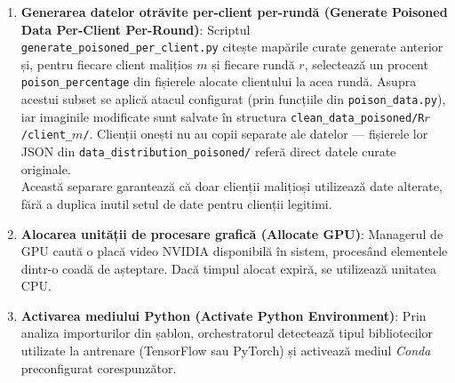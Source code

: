 \documentclass[../../main.tex]{subfiles}
\begin{document}
\begin{enumerate}
        \item \textbf{Generarea datelor otrăvite per-client per-rundă (Generate Poisoned Data Per-Client Per-Round)}: Scriptul \texttt{generate\_poisoned\_per\_client\-.py} citește mapările curate generate anterior și, pentru fiecare client malițios $m$ și fiecare rundă $r$, selectează un procent \texttt{poison\_percentage} din fișierele alocate clientului la acea rundă. Asupra acestui subset se aplică atacul configurat (prin funcțiile din \texttt{poison\_data.py}), iar imaginile modificate sunt salvate în structura \texttt{clean\_data\_poisoned/R$r$/client\_$m$/}. Clienții onești nu au copii separate ale datelor --- fișierele lor JSON din \texttt{data\_distribution\_poisoned/} referă direct datele curate originale. \\ Această separare garantează că doar clienții malițioși utilizează date alterate, fără a duplica inutil setul de date pentru clienții legitimi.
        \item \textbf{Alocarea unității de procesare grafică (Allocate GPU)}: Managerul de GPU caută o placă video NVIDIA disponibilă în sistem, procesând elementele dintr-o coadă de așteptare. Dacă timpul alocat expiră, se utilizează unitatea CPU.
        \item \textbf{Activarea mediului Python (Activate Python Environment)}: Prin analiza importurilor din șablon, orchestratorul detectează tipul bibliotecilor utilizate la antrenare (TensorFlow sau PyTorch) și activează mediul \textit{Conda} preconfigurat corespunzător.


\end{enumerate}
\end{document}
